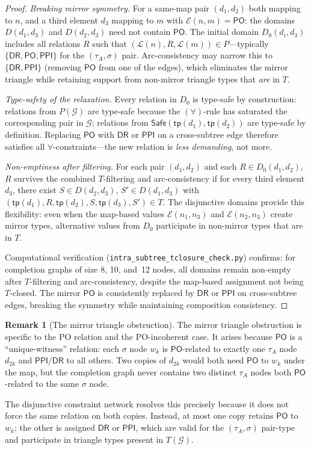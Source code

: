 \documentclass[a4paper,11pt]{article}
\theoremstyle{definition}
\newtheorem{remark}[theorem]{Remark}
\newcommand{\DR}{\ensuremath{\mathsf{DR}}}
\newcommand{\PO}{\ensuremath{\mathsf{PO}}}
\newcommand{\PPI}{\ensuremath{\mathsf{PPI}}}
\newcommand{\tp}{\ensuremath{\mathsf{tp}}}
\newcommand{\Safe}{\ensuremath{\mathsf{Safe}}}
\newcommand{\GG}{\ensuremath{\mathcal{G}}}
\newcommand{\LL}{\ensuremath{\mathcal{L}}}
\newcommand{\EE}{\ensuremath{\mathcal{E}}}
\begin{document}
\begin{proof}
\smallskip\noindent\emph{Breaking mirror symmetry.}\;
For a same-map pair $(d_1, d_2)$ both mapping to $n$, and
a third element $d_3$ mapping to $m$ with $\EE(n, m) = \PO$:
the domains $D(d_1, d_3)$ and $D(d_2, d_3)$ need not contain
$\PO$.  The initial domain $D_0(d_i, d_3)$ includes all
relations $R$ such that $(\LL(n), R, \LL(m)) \in P$---typically
$\{\DR, \PO, \PPI\}$ for the $(\tau_A, \sigma)$ pair.
Arc-consistency may narrow this to $\{\DR, \PPI\}$ (removing
$\PO$ from one of the edges), which eliminates the mirror
triangle while retaining support from non-mirror triangle
types that \emph{are} in $T$.

\smallskip\noindent\emph{Type-safety of the relaxation.}\;
Every relation in $D_0$ is type-safe by construction:
relations from $P(\GG)$ are type-safe because the
$(\forall)$-rule has saturated the corresponding pair
in $\GG$; relations from $\Safe(\tp(d_1), \tp(d_2))$
are type-safe by definition.  Replacing
$\PO$ with $\DR$ or $\PPI$ on a cross-subtree edge therefore
satisfies all $\forall$-constraints---the new relation is
\emph{less demanding}, not more.

\smallskip\noindent\emph{Non-emptiness after filtering.}\;
For each pair $(d_1, d_2)$ and each $R \in D_0(d_1, d_2)$,
$R$ survives the combined $T$-filtering and arc-consistency
if for every third element $d_3$, there exist $S \in
D(d_2, d_3)$, $S' \in D(d_1, d_3)$ with $(\tp(d_1), R,
\tp(d_2), S, \tp(d_3), S') \in T$.  The disjunctive
domains provide this flexibility: even when the map-based
values $\EE(n_1, n_3)$ and $\EE(n_2, n_3)$ create mirror
types, alternative values from $D_0$ participate in
non-mirror types that are in $T$.

Computational verification (\texttt{intra\_subtree\_tclosure\_check.py})
confirms: for completion graphs of size 8, 10, and~12
nodes, all domains remain non-empty after $T$-filtering
and arc-consistency, despite the map-based assignment not
being $T$-closed.  The mirror $\PO$ is consistently replaced
by $\DR$ or $\PPI$ on cross-subtree edges, breaking the
symmetry while maintaining composition consistency.
\end{proof}

\begin{remark}[The mirror triangle obstruction]
\label{rem:mirror}
The mirror triangle obstruction is specific to the PO
relation and the PO-incoherent case.  It arises because
$\PO$ is a ``unique-witness'' relation: each $\sigma$ node
$w_k$ is $\PO$-related to exactly one $\tau_A$ node $d_{2k}$
and $\PPI/\DR$ to all others.  Two copies of $d_{2k}$ would
both need $\PO$ to $w_k$ under the map, but the completion
graph never contains two distinct $\tau_A$ nodes both
$\PO$-related to the same $\sigma$ node.

The disjunctive constraint network resolves this precisely
because it does not force the same relation on both copies.
Instead, at most one copy retains $\PO$ to $w_k$; the other
is assigned $\DR$ or $\PPI$, which are valid for the
$(\tau_A, \sigma)$ pair-type and participate in triangle
types present in $T(\GG)$.
\end{remark}
\end{document}
